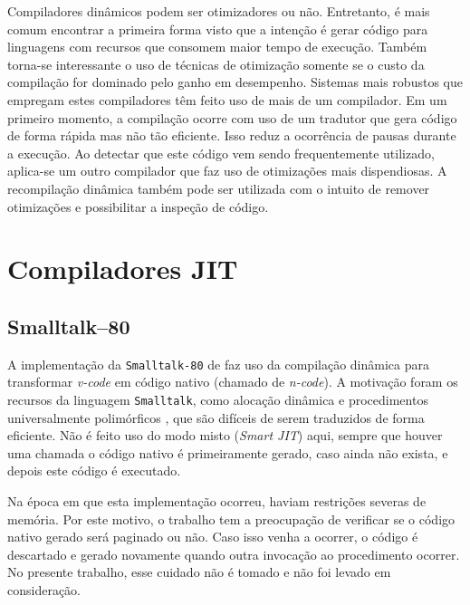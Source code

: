 Compiladores dinâmicos podem ser otimizadores ou não. Entretanto, é
mais comum encontrar a primeira forma visto que a intenção é gerar
código para linguagens com recursos que consomem maior tempo de
execução. Também torna-se interessante o uso de técnicas de otimização somente
se o custo da compilação for dominado pelo ganho em desempenho.
 Sistemas mais robustos \cite{holzle, judo, suganuma_ibm}
que empregam estes compiladores têm feito uso de mais de um
compilador. Em um primeiro momento, a compilação ocorre com uso de um
tradutor que gera código de forma rápida mas não tão eficiente. Isso
reduz a ocorrência de pausas durante a execução. Ao
detectar que este código vem sendo frequentemente utilizado,
aplica-se um outro compilador que faz uso de otimizações mais
dispendiosas. A recompilação dinâmica \cite{holzle} também pode ser
utilizada com o intuito de remover otimizações e possibilitar a inspeção
de código.



\section{Compiladores JIT}


\subsection{Smalltalk--80}

A implementação da \texttt{Smalltalk-80} \cite{bluebook} de
 faz uso da compilação dinâmica para
transformar \textit{v-code} em código nativo (chamado de
\textit{n-code}). A motivação foram os
recursos da linguagem \texttt{Smalltalk}, como alocação dinâmica e
procedimentos universalmente polimórficos \cite{sebesta}, que são
difíceis de serem traduzidos de forma eficiente. Não é feito uso do
modo misto (\textit{Smart JIT}) aqui, sempre que houver uma chamada
o código nativo é primeiramente gerado, caso ainda não exista, e
depois este código é executado.

Na época em que esta implementação ocorreu, haviam restrições severas
de memória. Por este motivo, o trabalho tem a preocupação de verificar
se o código nativo gerado será paginado ou não. Caso isso venha a
ocorrer, o código é descartado e gerado novamente quando outra
invocação ao procedimento ocorrer. No presente trabalho, esse cuidado
não é tomado e não foi levado em consideração.

